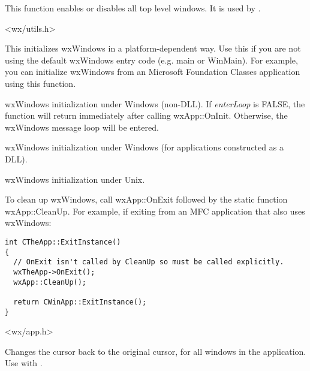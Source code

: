 This function enables or disables all top level windows. It is used by
.


<wx/utils.h>

\label{wxentry}

This initializes wxWindows in a platform-dependent way. Use this if you
are not using the default wxWindows entry code (e.g. main or WinMain). For example,
you can initialize wxWindows from an Microsoft Foundation Classes application using
this function.


wxWindows initialization under Windows (non-DLL). If {\it enterLoop} is FALSE, the
function will return immediately after calling wxApp::OnInit. Otherwise, the wxWindows
message loop will be entered.


wxWindows initialization under Windows (for applications constructed as a DLL).


wxWindows initialization under Unix.


To clean up wxWindows, call wxApp::OnExit followed by the static function
wxApp::CleanUp. For example, if exiting from an MFC application that also uses wxWindows:

\begin{verbatim}
int CTheApp::ExitInstance()
{
  // OnExit isn't called by CleanUp so must be called explicitly.
  wxTheApp->OnExit();
  wxApp::CleanUp();

  return CWinApp::ExitInstance();
}
\end{verbatim}


<wx/app.h>

\label{wxendbusycursor}


Changes the cursor back to the original cursor, for all windows in the application.
Use with .

